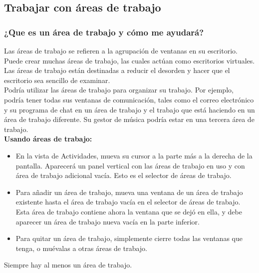 \subsection{Trabajar con áreas de trabajo}
\subsubsection{¿Que es un área de trabajo y cómo me ayudará?}
Las áreas de trabajo se refieren a la agrupación de ventanas en su escritorio. Puede crear muchas áreas de trabajo, las cuales actúan como escritorios virtuales. Las áreas de trabajo están destinadas a reducir el desorden y hacer que el escritorio sea sencillo de examinar.\\

Podría utilizar las áreas de trabajo para organizar su trabajo. Por ejemplo, podría tener todas sus ventanas de comunicación, tales como el correo electrónico y su programa de chat en un área de trabajo y el trabajo que está haciendo en un área de trabajo diferente. Su gestor de música podría estar en una tercera área de trabajo.\\

{\bf Usando áreas de trabajo:}
\begin{itemize}
\item En la vista de Actividades, mueva su cursor a la parte más a la derecha de la pantalla. Aparecerá un panel vertical con las áreas de trabajo en uso y con área de trabajo adicional vacía. Esto es el selector de áreas de trabajo.
\item Para añadir un área de trabajo, mueva una ventana de un área de trabajo existente hasta el área de trabajo vacía en el selector de áreas de trabajo. Esta área de trabajo contiene ahora la ventana que se dejó en ella, y debe aparecer un área de trabajo nueva vacía en la parte inferior.
\item Para quitar un área de trabajo, simplemente cierre todas las ventanas que tenga, o muévalas a otras áreas de trabajo.
\end{itemize}
Siempre hay al menos un área de trabajo.
